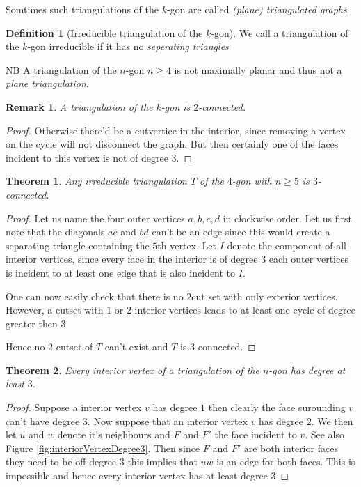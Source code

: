 \documentclass[a4paper]{article}
\newtheorem{thrm}{Theorem}
\newtheorem{remark}{Remark}
\theoremstyle{definition}
\newtheorem*{defi}{Definition}
\begin{document}
Somtimes such triangulations of the $k$-gon are called \emph{(plane) triangulated graphs}.


\begin{defi}[Irreducible triangulation of the $k$-gon]
We call a triangulation of the $k$-gon irreducible if it has no \emph{seperating triangles}
\end{defi}



NB A triangulation of the $n$-gon $n\geq 4$ is not maximally planar and thus not a \emph{plane triangulation}.

\begin{remark}
A triangulation of the $k$-gon is $2$-connected.
\end{remark}
\begin{proof}

Otherwise there’d be a cutvertice in the interior, since removing a vertex on the cycle will not disconnect the graph. But then certainly one of the faces incident to this vertex is not of degree $3$.
\end{proof}

\begin{thrm}
Any irreducible triangulation $T$ of the $4$-gon with $n \geq 5$ is $3$-connected. %
\end{thrm}

\begin{proof} 
Let us name the four outer vertices $a,b,c,d$ in clockwise order. Let us first note that the diagonals $ac$ and $bd$ can't be an edge since this would create a separating triangle containing the $5$th vertex. Let $I$ denote the component of all interior vertices, since every face in the interior is of degree $3$ each outer vertices is incident to at least one edge that is also incident to $I$. %

One can now easily check that there is no $2$cut set with only exterior vertices. However, a cutset with $1$ or $2$ interior vertices leads to at least one cycle of degree greater then $3$ %

Hence no $2$-cutset of $T$ can't exist and $T$ is $3$-connected. 
\end{proof}

\begin{thrm} %
Every interior vertex of a triangulation of the $n$-gon has degree at least $3$.
\end{thrm}
\begin{proof}
Suppose a interior vertex $v$ has degree $1$ then clearly the face surounding $v$ can't have degree $3$. Now suppose that an interior vertex $v$ has degree $2$. We then let $u$ and $w$ denote it's neighbours and $F$ and $F'$ the face incident to $v$. See also Figure \ref{fig:interiorVertexDegree3}. Then since $F$ and $F'$ are both interior faces they need to be off degree $3$ this implies that $uw$ is an edge for both faces. This is impossible and hence every interior vertex has at least degree $3$
\end{proof}
\end{document}

